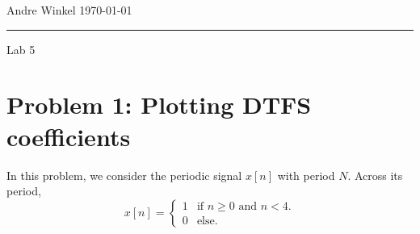 \documentclass[12pt]{article}
\begin{document}
\noindent Andre Winkel \hfill \today \\
\rule{\textwidth}{0.4pt} \vspace{0em}
\begin{center} \large{Lab 5} \end{center} \vspace*{0em}

\section*{Problem 1: Plotting DTFS coefficients}
In this problem, we consider the periodic signal $x[n]$ with period $N$. Across its period,
\begin{equation}
    x[n]=
    \begin{cases}
        1 & \text{if } n\ge0 \text{ and } n<4.\\
        0 & \text{else.}
    \end{cases}
\end{equation}
\end{document}
